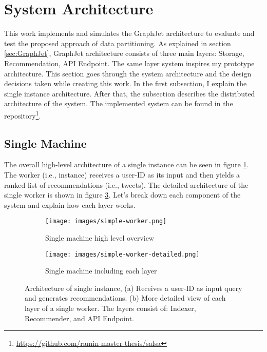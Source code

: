 \section{System Architecture}
\label{sec:system-architecture}

This work implements and simulates the GraphJet architecture to evaluate and test the proposed approach of data partitioning. As explained in section \ref{sec:GraphJet}, GraphJet architecture consists of three main layers: Storage, Recommendation, API Endpoint. The same layer system inspires my prototype architecture. This section goes through the system architecture and the design decisions taken while creating this work. In the first subsection, I explain the single instance architecture. After that, the subsection describes the distributed architecture of the system. The implemented system can be found in the repository\footnote{\url{https://github.com/ramin-master-thesis/salsa}}.


\subsection{Single Machine}
\label{subsec:single-machine}
The overall high-level architecture of a single instance can be seen in figure \ref{fig:single-machine-architecture}. The worker (i.e., instance) receives a user-ID as its input and then yields a ranked list of recommendations (i.e., tweets). The detailed architecture of the single worker is shown in figure \ref{fig:single-machine-architecture-detailed}. Let's break down each component of the system and explain how each layer works.

\begin{figure}[!h]
    \centering
    \begin{subfigure}[b]{0.75\textwidth}
       \texttt{[image: images/simple-worker.png]}
       \caption{Single machine high level overview}
       \label{fig:single-machine-architecture} 
    \end{subfigure}
    
    \begin{subfigure}[b]{0.8\textwidth}
       \texttt{[image: images/simple-worker-detailed.png]}
       \caption{Single machine including each layer}
       \label{fig:single-machine-architecture-detailed}
    \end{subfigure}
    
    \caption {Architecture of single instance, (a) Receives a user-ID as input query and generates recommendations. (b) More detailed view of each layer of a single worker. The layers consist of: Indexer, Recommender, and API Endpoint.}
\end{figure}


